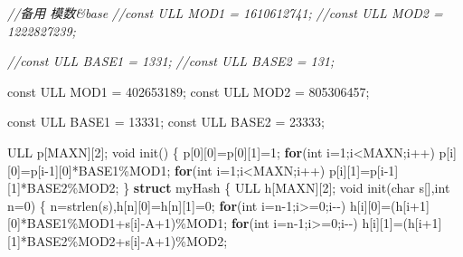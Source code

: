 \documentclass[
]{article}
\newenvironment{Shaded}{}{}
\newcommand{\AttributeTok}[1]{\textcolor[rgb]{0.49,0.56,0.16}{#1}}
\newcommand{\CharTok}[1]{\textcolor[rgb]{0.25,0.44,0.63}{#1}}
\newcommand{\CommentTok}[1]{\textcolor[rgb]{0.38,0.63,0.69}{\textit{#1}}}
\newcommand{\ControlFlowTok}[1]{\textcolor[rgb]{0.00,0.44,0.13}{\textbf{#1}}}
\newcommand{\DataTypeTok}[1]{\textcolor[rgb]{0.56,0.13,0.00}{#1}}
\newcommand{\DecValTok}[1]{\textcolor[rgb]{0.25,0.63,0.44}{#1}}
\newcommand{\KeywordTok}[1]{\textcolor[rgb]{0.00,0.44,0.13}{\textbf{#1}}}
\newcommand{\NormalTok}[1]{#1}
\begin{document}
\begin{Shaded}
\begin{Highlighting}[]
\CommentTok{//备用 模数\&base}
\CommentTok{//const ULL MOD1 = 1610612741;}
\CommentTok{//const ULL MOD2 = 1222827239;}

\CommentTok{//const ULL BASE1 = 1331;}
\CommentTok{//const ULL BASE2 = 131;}

\AttributeTok{const}\NormalTok{ ULL MOD1 = }\DecValTok{402653189}\NormalTok{;}
\AttributeTok{const}\NormalTok{ ULL MOD2 = }\DecValTok{805306457}\NormalTok{;}

\AttributeTok{const}\NormalTok{ ULL BASE1 = }\DecValTok{13331}\NormalTok{;}
\AttributeTok{const}\NormalTok{ ULL BASE2 = }\DecValTok{23333}\NormalTok{;}

\NormalTok{ULL p[MAXN][}\DecValTok{2}\NormalTok{];}
\DataTypeTok{void}\NormalTok{ init()}
\NormalTok{\{}
\NormalTok{    p[}\DecValTok{0}\NormalTok{][}\DecValTok{0}\NormalTok{]=p[}\DecValTok{0}\NormalTok{][}\DecValTok{1}\NormalTok{]=}\DecValTok{1}\NormalTok{;}
    \ControlFlowTok{for}\NormalTok{(}\DataTypeTok{int}\NormalTok{ i=}\DecValTok{1}\NormalTok{;i\textless{}MAXN;i++) p[i][}\DecValTok{0}\NormalTok{]=p[i{-}}\DecValTok{1}\NormalTok{][}\DecValTok{0}\NormalTok{]*BASE1\%MOD1;}
    \ControlFlowTok{for}\NormalTok{(}\DataTypeTok{int}\NormalTok{ i=}\DecValTok{1}\NormalTok{;i\textless{}MAXN;i++) p[i][}\DecValTok{1}\NormalTok{]=p[i{-}}\DecValTok{1}\NormalTok{][}\DecValTok{1}\NormalTok{]*BASE2\%MOD2;}
\NormalTok{\}}
\KeywordTok{struct}\NormalTok{ myHash}
\NormalTok{\{}
\NormalTok{    ULL h[MAXN][}\DecValTok{2}\NormalTok{];}
    \DataTypeTok{void}\NormalTok{ init(}\DataTypeTok{char}\NormalTok{ s[],}\DataTypeTok{int}\NormalTok{ n=}\DecValTok{0}\NormalTok{)}
\NormalTok{    \{}
\NormalTok{        n=strlen(s),h[n][}\DecValTok{0}\NormalTok{]=h[n][}\DecValTok{1}\NormalTok{]=}\DecValTok{0}\NormalTok{;}
        \ControlFlowTok{for}\NormalTok{(}\DataTypeTok{int}\NormalTok{ i=n{-}}\DecValTok{1}\NormalTok{;i\textgreater{}=}\DecValTok{0}\NormalTok{;i{-}{-}) h[i][}\DecValTok{0}\NormalTok{]=(h[i+}\DecValTok{1}\NormalTok{][}\DecValTok{0}\NormalTok{]*BASE1\%MOD1+s[i]{-}}\CharTok{\textquotesingle{}A\textquotesingle{}}\NormalTok{+}\DecValTok{1}\NormalTok{)\%MOD1;}
        \ControlFlowTok{for}\NormalTok{(}\DataTypeTok{int}\NormalTok{ i=n{-}}\DecValTok{1}\NormalTok{;i\textgreater{}=}\DecValTok{0}\NormalTok{;i{-}{-}) h[i][}\DecValTok{1}\NormalTok{]=(h[i+}\DecValTok{1}\NormalTok{][}\DecValTok{1}\NormalTok{]*BASE2\%MOD2+s[i]{-}}\CharTok{\textquotesingle{}A\textquotesingle{}}\NormalTok{+}\DecValTok{1}\NormalTok{)\%MOD2;}

\end{Highlighting}
\end{Shaded}
\end{document}
